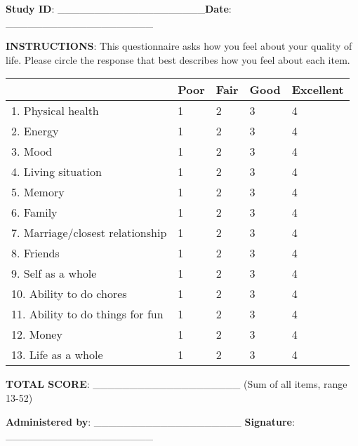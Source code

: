 \begin{tcolorbox}[title=Quality of Life - Alzheimer's Disease (QOL-AD) Assessment Form]
\textbf{Study ID}: \_\_\_\_\_\_\_\_\_\_\_\_\_\_\_\_\_\_\_\_\hfill \textbf{Date}: \_\_\_\_\_\_\_\_\_\_\_\_\_\_\_\_\_\_\_\_

\vspace{0.5cm}

\textbf{INSTRUCTIONS}: This questionnaire asks how you feel about your quality of life. Please circle the response that best describes how you feel about each item.

\vspace{0.5cm}

\begin{tabular}{|p{5cm}|p{2cm}|p{2cm}|p{2cm}|p{2cm}|}
\hline
 & \textbf{Poor} & \textbf{Fair} & \textbf{Good} & \textbf{Excellent} \\
\hline
1. Physical health & 1 & 2 & 3 & 4 \\
\hline
2. Energy & 1 & 2 & 3 & 4 \\
\hline
3. Mood & 1 & 2 & 3 & 4 \\
\hline
4. Living situation & 1 & 2 & 3 & 4 \\
\hline
5. Memory & 1 & 2 & 3 & 4 \\
\hline
6. Family & 1 & 2 & 3 & 4 \\
\hline
7. Marriage/closest relationship & 1 & 2 & 3 & 4 \\
\hline
8. Friends & 1 & 2 & 3 & 4 \\
\hline
9. Self as a whole & 1 & 2 & 3 & 4 \\
\hline
10. Ability to do chores & 1 & 2 & 3 & 4 \\
\hline
11. Ability to do things for fun & 1 & 2 & 3 & 4 \\
\hline
12. Money & 1 & 2 & 3 & 4 \\
\hline
13. Life as a whole & 1 & 2 & 3 & 4 \\
\hline
\end{tabular}

\vspace{0.5cm}

\textbf{TOTAL SCORE}: \_\_\_\_\_\_\_\_\_\_\_\_\_\_\_\_\_\_\_\_ (Sum of all items, range 13-52)

\vspace{0.5cm}

\textbf{Administered by}: \_\_\_\_\_\_\_\_\_\_\_\_\_\_\_\_\_\_\_\_ \hfill \textbf{Signature}: \_\_\_\_\_\_\_\_\_\_\_\_\_\_\_\_\_\_\_\_
\end{tcolorbox}

